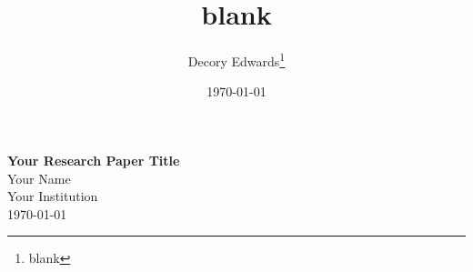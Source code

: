 \documentclass[titlepage]{article}
\begin{document}
\title{blank}
\author{Decory Edwards\thanks{blank}}
\date{\today}

\begin{center}
    {\LARGE \bfseries Your Research Paper Title}  %
    \\[1.5em]  %
    {\large Your Name\footnotemark}  %
    \\[0.5em]  %
    {\small Your Institution}  %
    \\[1em]  %
    {\small \today}  %
  \end{center}


\begin{abstract}
  
\end{abstract}





\end{document}
